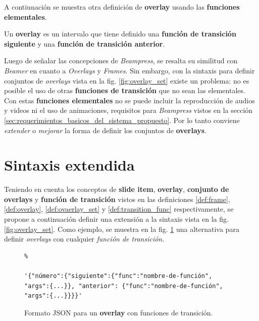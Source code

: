 		A contiunación se muestra otra definición de \textbf{overlay} usando las \textbf{funciones elementales}.

		\begin{definition}
		\label{def:new_overlay}

 			Un \textbf{overlay} es un intervalo que tiene definido una \textbf{función de transición siguiente} y una \textbf{función de transición anterior}.

		\end{definition}		





	Luego de señalar las concepciones de \textit{Beampress}, se resalta su similitud con \textit{Beamer} en cuanto a \textit{Overlays} y \textit{Frames}. Sin embargo, con la sintaxis para definir conjuntos de \textit{overlays} vista en la fig. \ref{fig:overlay_set} existe un problema: no es posible el uso de otras	\textbf{funciones de transición} que no sean las elementales. Con estas \textbf{funciones elementales} no se puede incluir la reproducción de audios y videos ni el uso de animaciones, requisitos para \textit{Beampress} vistos en la sección \ref{sec:requerimientos_basicos_del_sistema_propuesto}.	Por lo tanto conviene \textit{extender} o \textit{mejorar} la forma de definir los conjuntos de \textbf{overlays}.



	\section{Sintaxis extendida} %
	\label{sec:sintaxis_extendida}
	

	Teniendo en cuenta los conceptos de \textbf{slide item}, \textbf{overlay}, \textbf{conjunto de overlays} y \textbf{función de transición} vistos en las definiciones \ref{def:frame}, \ref{def:overlay}, \ref{def:ovaerlay_set} y \ref{def:transition_func} respectivamente, se propone a continuación definir una extensión a la sintaxis vista en la fig.\ref{fig:overlay_set}. Como ejemplo, se muestra en la fig. \ref{fig:json_format} una alternativa para definir \textit{overlays} con cualquier \textit{función de transición}.

		\begin{figure}[htb]%
			\begin{lstlisting}%

'{"número":{"siguiente":{"func":"nombre-de-función", "args":{...}}, "anterior": {"func":"nombre-de-función", "args":{...}}}}'	
			\end{lstlisting}
		\caption{
			Formato JSON para un \textbf{overlay} con funciones de transición. 
			\label{fig:json_format} }
		\end{figure}


